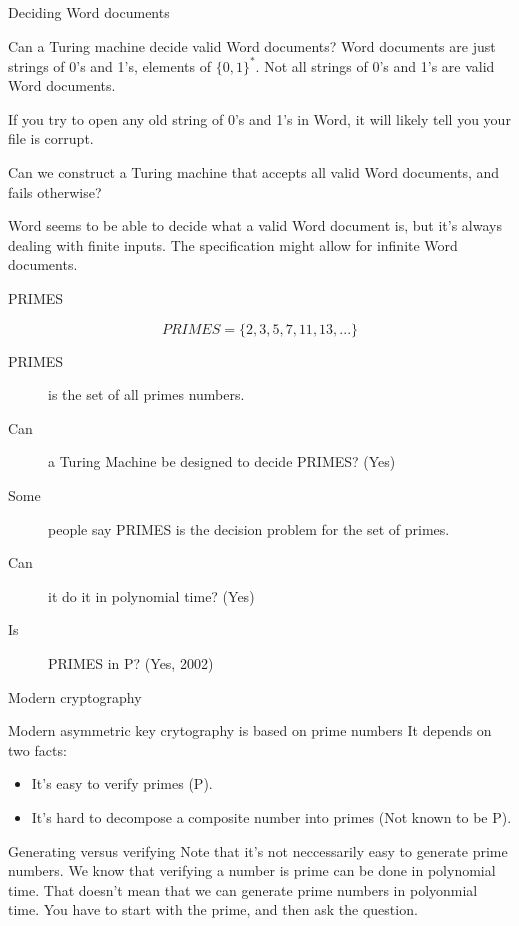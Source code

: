 \begin{frame}{Deciding Word documents}
  \begin{alertblock}{Can a Turing machine decide valid Word documents?}
    Word documents are just strings of 0's and 1's, elements of $\{0,1\}^*$.
    Not all strings of 0's and 1's are valid Word documents.
    
    If you try to open any old string of 0's and 1's in Word, it will likely tell you your file is corrupt.
    
    Can we construct a Turing machine that accepts all valid Word documents, and fails otherwise?
    
    Word seems to be able to decide what a valid Word document is, but it's always dealing with finite inputs.
    The specification might allow for infinite Word documents.
  \end{alertblock}
\end{frame}

\begin{frame}{PRIMES}
  \begin{definition}
    $$ PRIMES = \{ 2, 3, 5, 7, 11, 13, ... \} $$
  \end{definition}
  \begin{description}
    \item[PRIMES] is the set of all primes numbers.
    \item[Can] a Turing Machine be designed to decide PRIMES? (Yes)
    \item[Some] people say PRIMES is the decision problem for the set of primes.
    \item[Can] it do it in polynomial time? (Yes)
    \item[Is] PRIMES in P? (Yes, 2002)
  \end{description}
\end{frame}

\begin{frame}{Modern cryptography}
  \begin{alertblock}{Modern asymmetric key crytography is based on prime numbers}
    It depends on two facts:
    \begin{itemize}
      \item It's easy to verify primes (P).
      \item It's hard to decompose a composite number into primes (Not known to be P).
    \end{itemize}
  \end{alertblock}
  \begin{alertblock}{Generating versus verifying}
    Note that it's not neccessarily easy to generate prime numbers.
    We know that verifying a number is prime can be done in polynomial time.
    That doesn't mean that we can generate prime numbers in polyonmial time.
    You have to start with the prime, and then ask the question.
  \end{alertblock}

\end{frame}

